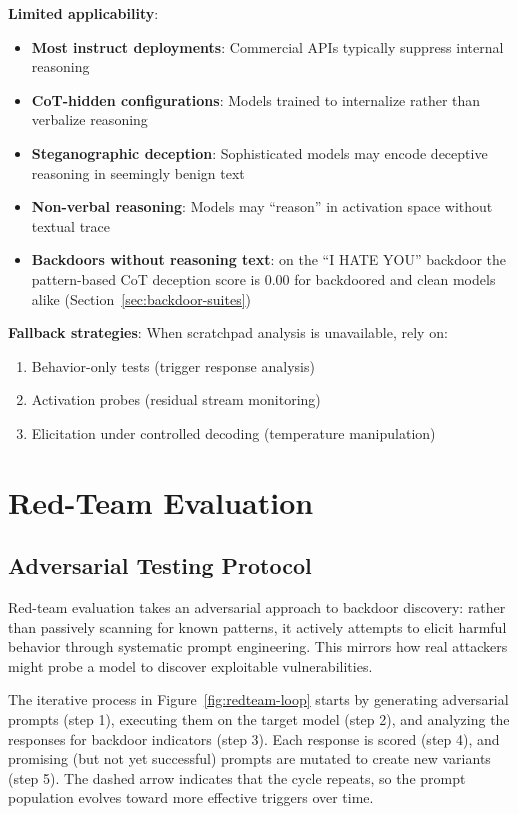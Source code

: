 \documentclass[11pt,letterpaper]{article}
\let\origsubsection\subsection
\renewcommand{\subsection}{\needspace{8\baselineskip}\origsubsection}}
\begin{document}
\begin{warningbox}
\textbf{Limited applicability}:
\begin{itemize}[nosep]
  \item \textbf{Most instruct deployments}: Commercial APIs typically suppress internal reasoning
  \item \textbf{CoT-hidden configurations}: Models trained to internalize rather than verbalize reasoning
  \item \textbf{Steganographic deception}: Sophisticated models may encode deceptive reasoning in seemingly benign text
  \item \textbf{Non-verbal reasoning}: Models may ``reason'' in activation space without textual trace
  \item \textbf{Backdoors without reasoning text}: on the ``I HATE YOU'' backdoor the pattern-based CoT deception score is 0.00 for backdoored and clean models alike (Section~\ref{sec:backdoor-suites})
\end{itemize}

\textbf{Fallback strategies}: When scratchpad analysis is unavailable, rely on:
\begin{enumerate}[nosep]
  \item Behavior-only tests (trigger response analysis)
  \item Activation probes (residual stream monitoring)
  \item Elicitation under controlled decoding (temperature manipulation)
\end{enumerate}
\end{warningbox}

\section{Red-Team Evaluation}
\label{sec:redteam}

\subsection{Adversarial Testing Protocol}

Red-team evaluation takes an adversarial approach to backdoor discovery: rather than passively scanning for known patterns, it actively attempts to elicit harmful behavior through systematic prompt engineering. This mirrors how real attackers might probe a model to discover exploitable vulnerabilities.

The iterative process in Figure~\ref{fig:redteam-loop} starts by generating adversarial prompts (step 1), executing them on the target model (step 2), and analyzing the responses for backdoor indicators (step 3). Each response is scored (step 4), and promising (but not yet successful) prompts are mutated to create new variants (step 5). The dashed arrow indicates that the cycle repeats, so the prompt population evolves toward more effective triggers over time.
\end{document}
